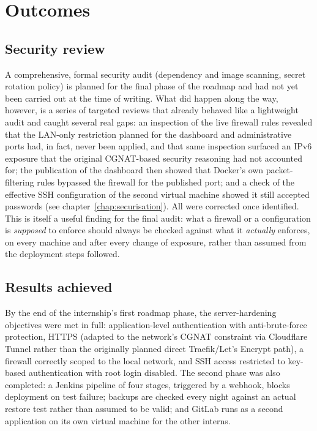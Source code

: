 \chapter{Outcomes}
\label{chap:bilan}

\section{Security review}
A comprehensive, formal security audit (dependency and image scanning, secret rotation policy) is planned for the final phase of the roadmap and had not yet been carried out at the time of writing. What did happen along the way, however, is a series of targeted reviews that already behaved like a lightweight audit and caught several real gaps: an inspection of the live firewall rules revealed that the LAN-only restriction planned for the dashboard and administrative ports had, in fact, never been applied, and that same inspection surfaced an IPv6 exposure that the original CGNAT-based security reasoning had not accounted for; the publication of the dashboard then showed that Docker's own packet-filtering rules bypassed the firewall for the published port; and a check of the effective SSH configuration of the second virtual machine showed it still accepted passwords (see chapter~\ref{chap:securisation}). All were corrected once identified. This is itself a useful finding for the final audit: what a firewall or a configuration is \emph{supposed} to enforce should always be checked against what it \emph{actually} enforces, on every machine and after every change of exposure, rather than assumed from the deployment steps followed.

\section{Results achieved}
By the end of the internship's first roadmap phase, the server-hardening objectives were met in full: application-level authentication with anti-brute-force protection, HTTPS (adapted to the network's CGNAT constraint via Cloudflare Tunnel rather than the originally planned direct Traefik/Let's Encrypt path), a firewall correctly scoped to the local network, and SSH access restricted to key-based authentication with root login disabled. The second phase was also completed: a Jenkins pipeline of four stages, triggered by a webhook, blocks deployment on test failure; backups are checked every night against an actual restore test rather than assumed to be valid; and GitLab runs as a second application on its own virtual machine for the other interns.

